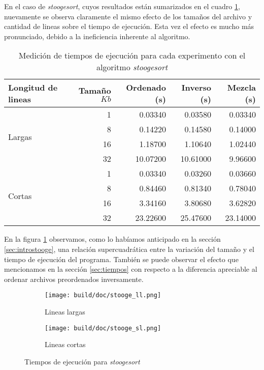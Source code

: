 \documentclass[a4paper,11pt]{article}
\begin{document}
\FloatBarrier

En el caso de \textit{stoogesort}, cuyos resultados están sumarizados en el
cuadro \ref{tab:medicionesstooge}, nuevamente se observa claramente el mismo
efecto de los tamaños del archivo y cantidad de lineas sobre el tiempo de
ejecución. Esta vez el efecto es mucho más pronunciado, debido a la
ineficiencia inherente al algoritmo.

\begin{table}[h!]
\centering
\begin{tabular}{ | l | r | r | r |r | }
  \hline
  Longitud de lineas            & Tamaño \(Kb\) & Ordenado (s) & Inverso (s) & Mezcla (s) \\ \hline
   \multirow{4}{*}{Largas}      & 1             & 0.03340      & 0.03580     & 0.03340 \\
                                & 8             & 0.14220      & 0.14580     & 0.14000 \\
                                & 16            & 1.18700      & 1.10640     & 1.02440 \\
                                & 32            & 10.07200     & 10.61000    & 9.96600 \\ \hline
  \multirow{4}{*}{Cortas}       & 1             & 0.03340      & 0.03260     & 0.03660 \\
                                & 8             & 0.84460      & 0.81340     & 0.78040 \\
                                & 16            & 3.34160      & 3.80680     & 3.62820 \\
                                & 32            & 23.22600     & 25.47600    & 23.14000 \\
  \hline
\end{tabular}
\caption{Medición de tiempos de ejecución para cada experimento con el algoritmo \textit{stoogesort}}
\label{tab:medicionesstooge}
\end{table}

En la figura \ref{fig:medicionesstooge} observamos, como lo habíamos anticipado
en la sección \ref{sec:introstooge}, una relación supercuadrática entre la
variación del tamaño y el tiempo de ejecución del programa. También se puede
observar el efecto que mencionamos en la sección \ref{sec:tiempos} con respecto
a la diferencia apreciable al ordenar archivos preordenados inversamente.

\begin{figure}
  \begin{subfigure}[b]{\textwidth}
    \centering
    \texttt{[image: build/doc/stooge\_ll.png]}
    \caption{Lineas largas}
  \end{subfigure}%

  \begin{subfigure}[b]{\textwidth}
    \centering
    \texttt{[image: build/doc/stooge\_sl.png]}
    \caption{Lineas cortas}
  \end{subfigure}
  \caption{Tiempos de ejecución para \textit{stoogesort}}\label{fig:medicionesstooge}
\end{figure}
\end{document}
